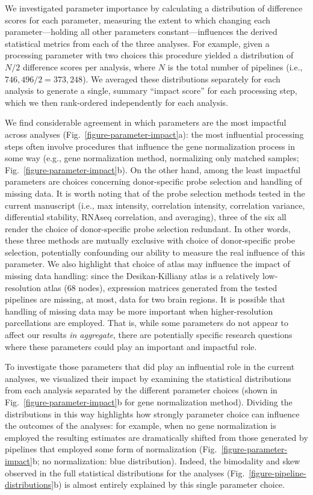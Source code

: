 \documentclass[12pt,aps,pra,reprint,showkeys]{revtex4-1}
\begin{document}
We investigated parameter importance by calculating a distribution of difference scores for each parameter, measuring the extent to which changing each parameter---holding all other parameters constant---influences the derived statistical metrics from each of the three analyses.
For example, given a processing parameter with two choices this procedure yielded a distribution of $N / 2$ difference scores per analysis, where $N$ is the total number of pipelines (i.e., $746,496 / 2 = 373,248$).
We averaged these distributions separately for each analysis to generate a single, summary ``impact score'' for each processing step, which we then rank-ordered independently for each analysis.

We find considerable agreement in which parameters are the most impactful across analyses (Fig.~\ref{figure-parameter-impact}a): the most influential processing steps often involve procedures that influence the gene normalization process in some way (e.g., gene normalization method, normalizing only matched samples; Fig.~\ref{figure-parameter-impact}b).
On the other hand, among the least impactful parameters are choices concerning donor-specific probe selection and handling of missing data.
It is worth noting that of the probe selection methods tested in the current manuscript (i.e., max intensity, correlation intensity, correlation variance, differential stability, RNAseq correlation, and averaging), three of the six all render the choice of donor-specific probe selection redundant.
In other words, these three methods are mutually exclusive with choice of donor-specific probe selection, potentially confounding our ability to measure the real influence of this parameter.
We also highlight that choice of atlas may influence the impact of missing data handling: since the Desikan-Killiany atlas is a relatively low-resolution atlas (68 nodes), expression matrices generated from the tested pipelines are missing, at most, data for two brain regions.
It is possible that handling of missing data may be more important when higher-resolution parcellations are employed.
That is, while some parameters do not appear to affect our results \emph{in aggregate}, there are potentially specific research questions where these parameters could play an important and impactful role.

To investigate those parameters that did play an influential role in the current analyses, we visualized their impact by examining the statistical distributions from each analysis separated by the different parameter choices (shown in Fig.~\ref{figure-parameter-impact}b for gene normalization method).
Dividing the distributions in this way highlights how strongly parameter choice can influence the outcomes of the analyses: for example, when no gene normalization is employed the resulting estimates are dramatically shifted from those generated by pipelines that employed some form of normalization (Fig.~\ref{figure-parameter-impact}b; no normalization: blue distribution).
Indeed, the bimodality and skew observed in the full statistical distributions for the analyses (Fig.~\ref{figure-pipeline-distributions}b) is almost entirely explained by this single parameter choice.
\end{document}
